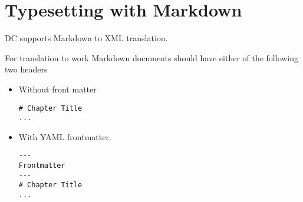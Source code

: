 




 


\section{Typesetting with Markdown}

DC supports Markdown to XML translation.  

\begin{gram}[Header]
For translation to work Markdown documents should have either of the following two headers
\begin{itemize}
\item Without front matter
\begin{lstlisting}
# Chapter Title
...
\end{lstlisting}  

\item  With YAML frontmatter.
\begin{lstlisting}
--- 
Frontmatter
---
# Chapter Title
...
\end{lstlisting}  
\end{itemize}
\end{gram}

